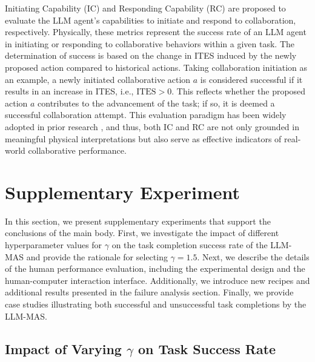 \documentclass[11pt]{article}
\begin{document}
Initiating Capability (IC) and Responding Capability (RC) are proposed to evaluate the LLM agent's capabilities to initiate and respond to collaboration, respectively. Physically, these metrics represent the success rate of an LLM agent in initiating or responding to collaborative behaviors within a given task. The determination of success is based on the change in ITES induced by the newly proposed action compared to historical actions. Taking collaboration initiation as an example, a newly initiated collaborative action $a$ is considered successful if it results in an increase in ITES, i.e., $\text{ITES} > 0$. This reflects whether the proposed action $a$ contributes to the advancement of the task; if so, it is deemed a successful collaboration attempt. This evaluation paradigm has been widely adopted in prior research \cite{gong2023mindagent,hong2023metagpt,mandi2024roco}, and thus, both IC and RC are not only grounded in meaningful physical interpretations but also serve as effective indicators of real-world collaborative performance.




\section{Supplementary Experiment}


In this section, we present supplementary experiments that support the conclusions of the main body. First, we investigate the impact of different hyperparameter values for $\gamma$ on the task completion success rate of the LLM-MAS and provide the rationale for selecting $\gamma = 1.5$. Next, we describe the details of the human performance evaluation, including the experimental design and the human-computer interaction interface. Additionally, we introduce new recipes and additional results presented in the failure analysis section. Finally, we provide case studies illustrating both successful and unsuccessful task completions by the LLM-MAS.


\subsection{Impact of Varying \texorpdfstring{$\gamma$}{gamma} on Task Success Rate}

\label{ap-gamma}
\end{document}
